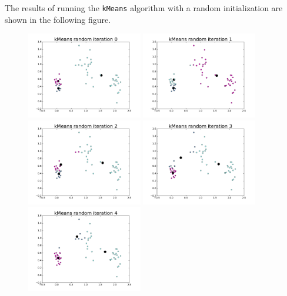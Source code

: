 \documentclass[12pt]{article}
\begin{document}
The results of running the \texttt{kMeans} algorithm with a random initialization are shown in the following figure.
\begin{figure}[h]
        \begin{adjustwidth}{-2in}{-2in}
                \begin{center}
                        \includegraphics[width=0.45\textwidth]{kMeansrandomiteration0}
                        \includegraphics[width=0.45\textwidth]{kMeansrandomiteration1}
                        \includegraphics[width=0.45\textwidth]{kMeansrandomiteration2}
                        \includegraphics[width=0.45\textwidth]{kMeansrandomiteration3}
                        \includegraphics[width=0.45\textwidth]{kMeansrandomiteration4}

\end{center}
\end{adjustwidth}
\end{figure}
\end{document}
